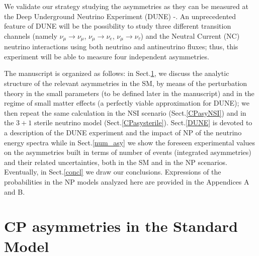 \documentclass[12pt]{article}
\begin{document}
We validate our strategy studying the asymmetries as they can be measured at the Deep Underground Neutrino Experiment (DUNE)  \cite{Acciarri:2016crz}-\cite{Abi:2020evt}. 
An unprecedented feature of DUNE will be the possibility to study three different transition channels (namely $\nu_\mu\to \nu_\mu$, $\nu_\mu\to \nu_e$, $\nu_\mu\to\nu_\tau$) and the Neutral Current (NC) neutrino interactions using both neutrino and antineutrino fluxes; thus, this experiment will be able to measure four independent asymmetries. 

The manuscript is organized as follows: in Sect.\ref{CPasySM}, we discuss the analytic structure of the relevant asymmetries in the SM, by means of the perturbation theory in the small parameters (to be defined later in the manuscript) and in the regime of small matter effects (a perfectly viable approximation for DUNE); we then repeat the same calculation in the NSI scenario (Sect.\ref{CPasyNSI}) and in the $3+1$ sterile neutrino model (Sect.\ref{CPasysterile}).  Sect.\ref{DUNE} is devoted to a description of the DUNE experiment and the impact of NP of the neutrino energy spectra while in Sect.\ref{num_asy} we show the foreseen  experimental values on the asymmetries built in terms of number of events (integrated asymmetries) and their related uncertainties, both in the SM and in the NP scenarios. Eventually, in Sect.\ref{concl} we draw our conclusions. Expressions of the probabilities in the NP models analyzed here are provided in the Appendices A and B. 


\section{CP asymmetries in the Standard Model} \label{CPasySM}
\end{document}
